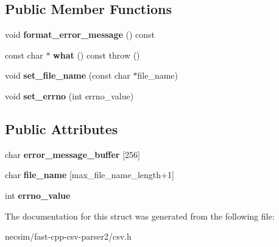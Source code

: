 \subsection*{Public Member Functions}
\begin{DoxyCompactItemize}
\item 
void {\bfseries format\+\_\+error\+\_\+message} () const \hypertarget{structio_1_1error_1_1can__not__open__file_a6b4f1a5ebfdbf12c6ee53c781c94b203}{}\label{structio_1_1error_1_1can__not__open__file_a6b4f1a5ebfdbf12c6ee53c781c94b203}

\item 
const char $\ast$ {\bfseries what} () const   throw ()\hypertarget{structio_1_1error_1_1base_ad99d4a2459e51ce2c24707569c4a0df6}{}\label{structio_1_1error_1_1base_ad99d4a2459e51ce2c24707569c4a0df6}

\item 
void {\bfseries set\+\_\+file\+\_\+name} (const char $\ast$file\+\_\+name)\hypertarget{structio_1_1error_1_1with__file__name_ae765de62778c989d4658b4efe2995390}{}\label{structio_1_1error_1_1with__file__name_ae765de62778c989d4658b4efe2995390}

\item 
void {\bfseries set\+\_\+errno} (int errno\+\_\+value)\hypertarget{structio_1_1error_1_1with__errno_a572cfa4b4a96792cd1d17dc9ad2eb5a9}{}\label{structio_1_1error_1_1with__errno_a572cfa4b4a96792cd1d17dc9ad2eb5a9}

\end{DoxyCompactItemize}
\subsection*{Public Attributes}
\begin{DoxyCompactItemize}
\item 
char {\bfseries error\+\_\+message\+\_\+buffer} \mbox{[}256\mbox{]}\hypertarget{structio_1_1error_1_1base_a8e38f86a7afea1f0c6e6cac0c548d6f2}{}\label{structio_1_1error_1_1base_a8e38f86a7afea1f0c6e6cac0c548d6f2}

\item 
char {\bfseries file\+\_\+name} \mbox{[}max\+\_\+file\+\_\+name\+\_\+length+1\mbox{]}\hypertarget{structio_1_1error_1_1with__file__name_ac957d5590a8b95517b74eb5bf373a424}{}\label{structio_1_1error_1_1with__file__name_ac957d5590a8b95517b74eb5bf373a424}

\item 
int {\bfseries errno\+\_\+value}\hypertarget{structio_1_1error_1_1with__errno_a99dcacba02cb53351fe64d7e064406be}{}\label{structio_1_1error_1_1with__errno_a99dcacba02cb53351fe64d7e064406be}

\end{DoxyCompactItemize}


The documentation for this struct was generated from the following file\+:\begin{DoxyCompactItemize}
\item 
necsim/fast-\/cpp-\/csv-\/parser2/csv.\+h\end{DoxyCompactItemize}
